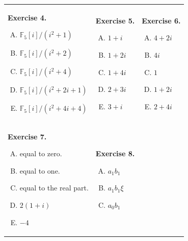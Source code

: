 \documentclass[../../book.tex]{subfiles}
\begin{document}
\begin{center}
    \begin{tabular}{p{4.5cm}p{3cm}p{4cm}}
        \textbf{Exercise 4.}
        \begin{enumerate}[(A)]
            \item $\mathbb{F}_5[i]/(i^2+1)$
            \item $\mathbb{F}_5[i]/(i^2+2)$
            \item $\mathbb{F}_5[i]/(i^2+4)$
            \item $\mathbb{F}_5[i]/(i^2+2i+1)$
            \item $\mathbb{F}_5[i]/(i^2+4i+4)$
        \end{enumerate} &   
        \textbf{Exercise 5.}
        \begin{enumerate}[(A)]
            \item $1+i$
            \item $1+2i$
            \item $1+4i$
            \item $2+3i$
            \item $3+i$
        \end{enumerate} &
        \textbf{Exercise 6.}
        \begin{enumerate}[(A)]
            \item $4+2i$
            \item $4i$
            \item $1$
            \item $1+2i$
            \item $2+4i$
        \end{enumerate}
        \\
        \textbf{Exercise 7.}
        \begin{enumerate}[(A)]
            \item equal to zero.
            \item equal to one.
            \item equal to the real part.
            \item $2(1+i)$
            \item $-4$
        \end{enumerate} & 
        \textbf{Exercise 8.}
        \begin{enumerate}[(A)]
            \item $a_1b_1$
            \item $a_1b_1\xi$
            \item $a_0b_1$

\end{enumerate}
\end{tabular}
\end{center}
\end{document}

